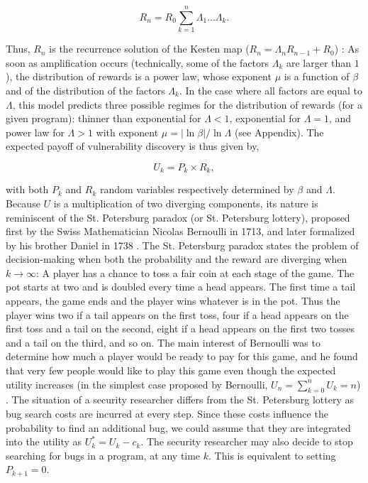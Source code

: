 \begin{equation}
R_{n} = R_{0} \sum_{k=1}^{n} \Lambda_1 ... \Lambda_k.
\end{equation}

Thus, $R_{n}$ is the recurrence solution of the  
Kesten map ($R_{n} = \Lambda_n R_{n-1} +R_0$)
\cite{kesten1973random,sornette1997convergent}:  As soon as amplification occurs (technically, 
some of the factors $\Lambda_k$ are larger than $1$), the distribution
of rewards is a power law, whose exponent $\mu$ is a function of $\beta$
and of the distribution of the factors $\Lambda_k$. In the case where
all factors are equal to $\Lambda$, this model predicts three possible regimes for the distribution of rewards (for a given program): thinner than exponential for $\Lambda < 1$, exponential for $\Lambda = 1$, and power law for $\Lambda > 1$ with exponent $\mu = |\ln \beta|/ \ln \Lambda$ (see Appendix). The expected payoff of vulnerability discovery is thus given by,

\begin{equation}
\label{ }
U_k = P_k \times R_k,
\end{equation}

\noindent with both $P_k$ and $R_k$ random variables respectively determined by $\beta$ and $\Lambda$. Because $U$ is a multiplication of two diverging components, its nature is reminiscent of the St. Petersburg paradox (or St. Petersburg lottery), proposed first by the Swiss Mathematician Nicolas Bernoulli in 1713, and later formalized by his brother Daniel in 1738 \cite{bernoulli1954exposition}.  The St. Petersburg paradox states the problem of decision-making when both the probability and the reward are diverging when $k \rightarrow \infty$: A player has a chance to toss a fair coin at each stage of the game. The pot starts at two and is doubled every time a head appears. The first time a tail appears, the game ends and the player wins whatever is in the pot. Thus the player wins two if a tail appears on the first toss, four if a head appears on the first toss and a tail on the second, eight if a head appears on the first two tosses and a tail on the third, and so on. The main interest of Bernoulli was to determine how much a player would be ready to pay for this game, and he found that very few people would like to play this game even though the expected utility increases (in the simplest case proposed by Bernoulli, $U_n = \sum_{k=0}^{n} U_k = n$) \cite{bernoulli1954exposition}. The situation of a security researcher differs from the St. Petersburg lottery as bug search costs are incurred at every step. Since these costs influence the probability to find an additional bug, we could assume that they are integrated into the utility as $U^{*}_k = U_k - c_k$. The security researcher may also decide to stop searching for bugs in a program, at any time $k$. This is equivalent to setting $P_{k+1} = 0$.\\

